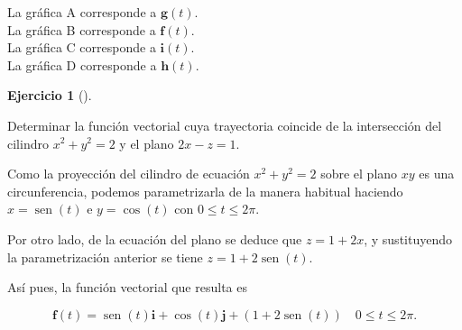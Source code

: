 \documentclass[
  a4paper,
]{scrreport}
\theoremstyle{definition}
\newtheorem{exercise}{Ejercicio}[chapter]
\theoremstyle{remark}
\begin{document}
\begin{tcolorbox}[enhanced jigsaw, rightrule=.15mm, opacityback=0, bottomtitle=1mm, titlerule=0mm, toprule=.15mm, breakable, colframe=quarto-callout-tip-color-frame, left=2mm, opacitybacktitle=0.6, title=\textcolor{quarto-callout-tip-color}{\faLightbulb}\hspace{0.5em}{Solución}, toptitle=1mm, colback=white, colbacktitle=quarto-callout-tip-color!10!white, arc=.35mm, bottomrule=.15mm, coltitle=black, leftrule=.75mm]

La gráfica A corresponde a \(\mathbf{g}(t)\).\\
La gráfica B corresponde a \(\mathbf{f}(t)\).\\
La gráfica C corresponde a \(\mathbf{i}(t)\).\\
La gráfica D corresponde a \(\mathbf{h}(t)\).

\end{tcolorbox}

\begin{exercise}[]\protect\hypertarget{exr-trayectoria-interseccion-superficies}{}\label{exr-trayectoria-interseccion-superficies}

Determinar la función vectorial cuya trayectoria coincide de la
intersección del cilindro \(x^2+y^2=2\) y el plano \(2x-z=1\).

\end{exercise}

\begin{tcolorbox}[enhanced jigsaw, rightrule=.15mm, opacityback=0, bottomtitle=1mm, titlerule=0mm, toprule=.15mm, breakable, colframe=quarto-callout-tip-color-frame, left=2mm, opacitybacktitle=0.6, title=\textcolor{quarto-callout-tip-color}{\faLightbulb}\hspace{0.5em}{Solución}, toptitle=1mm, colback=white, colbacktitle=quarto-callout-tip-color!10!white, arc=.35mm, bottomrule=.15mm, coltitle=black, leftrule=.75mm]

Como la proyección del cilindro de ecuación \(x^2+y^2=2\) sobre el plano
\(xy\) es una circunferencia, podemos parametrizarla de la manera
habitual haciendo \(x=\operatorname{sen}(t)\) e \(y=\cos(t)\) con
\(0\leq t \leq 2\pi\).

Por otro lado, de la ecuación del plano se deduce que \(z = 1+2x\), y
sustituyendo la parametrización anterior se tiene
\(z = 1+2\operatorname{sen}(t)\).

Así pues, la función vectorial que resulta es

\[
\mathbf{f}(t) = \operatorname{sen}(t)\mathbf{i} + \cos(t)\mathbf{j} + (1+2\operatorname{sen}(t)) \quad 0\leq t \leq 2\pi.
\]

\end{tcolorbox}
\end{document}
